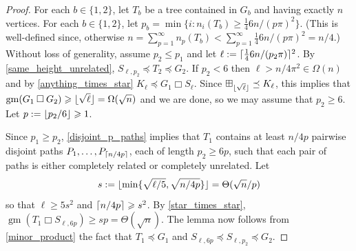 \documentclass[kpfonts,lotsofwhite]{patmorin}
\newcommand{\boxprod}{\mathbin{\Box}}
\DeclarePairedDelimiter{\floor}{\lfloor}{\rfloor}
\DeclarePairedDelimiter{\ceil}{\lceil}{\rceil}
\renewcommand{\ge}{\geqslant}
\renewcommand{\le}{\leqslant}
\DeclareMathOperator{\gm}{gm}
\newcommand{\pat}[1]{\textcolor{Maroon}{PM: #1}}
\theoremstyle{plain}
\theoremstyle{definition}
\begin{document}
\begin{proof}
  For each $b\in\{1,2\}$, let $T_b$ be a tree contained in $G_b$ and having exactly $n$ vertices.  For each $b\in\{1,2\}$, let $p_b=\min\{i: n_i(T_b)\ge \tfrac{1}{4}6n/(p\pi)^2\}$.  (This is well-defined since, otherwise $n=\sum_{p=1}^\infty n_p(T_b) < \sum_{p=1}^\infty \tfrac{1}{4}6n/(p\pi)^2 = n/4$.)  Without loss of generality, assume $p_2 \le p_1$ and let $\ell:=\ceil{\tfrac{1}{4}6n/(p_2\pi)}^2$. By \cref{same_height_unrelated}, $S_{\ell,p_2}\preceq T_2\preceq G_2$.  If $p_2 < 6$ then $\ell > n/4\pi^2\in\Omega(n)$ and by \cref{anything_times_star} $K_{\ell}\preceq G_1 \boxprod S_\ell$.  Since $\boxplus_{\floor{\sqrt{\ell}}}\preceq K_{\ell}$, this implies that $\gm(G_1\boxprod G_2)\ge \floor{\sqrt{\ell}}=\Omega(\sqrt{n})$ and we are done, so we may assume that $p_2\ge 6$. Let $p:=\floor{p_2/6}\ge 1$.

  Since $p_1\ge p_2$, \cref{disjoint_p_paths} implies that $T_1$ contains at least $n/4p$ pairwise disjoint paths $P_1,\ldots,P_{\ceil{n/4p}}$, each of length $p_2\ge 6p$, such that each pair of paths is either completely related or completely unrelated.  Let
  \[
    s:=\floor{\min\{\sqrt{\ell/5}, \sqrt{n/4p}\}} = \Theta(\sqrt{n}/p)
  \]
  so that $\ell \ge 5s^2$ and $\ceil{n/4p}\ge s^2$.  By \cref{star_times_star}, $\gm(T_1 \boxprod S_{\ell,6p}) \ge sp=\Theta(\sqrt{n})$.  The lemma now follows from \cref{minor_product} the fact that $T_1\preceq G_1$ and $S_{\ell,6p}\preceq S_{\ell,p_2}\preceq G_2$.
\end{proof}
\end{document}
